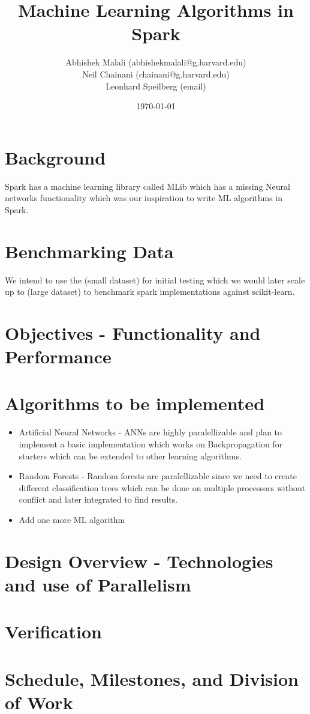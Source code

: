 \documentclass{article}
\begin{document}
	\title{Machine Learning Algorithms in Spark}
	\author{Abhishek Malali (abhishekmalali@g.harvard.edu)\\
			Neil Chainani (chainani@g.harvard.edu)\\
			Leonhard Speilberg (email)}
	\date{\today}
	\maketitle
	\section{Background}
	Spark has a machine learning library called MLib which has a missing Neural networks functionality which was our inspiration to write ML algorithms in Spark.

	\section{Benchmarking Data}
	We intend to use the (small dataset) for initial testing which we would later scale up to (large dataset) to benchmark spark implementations against scikit-learn. 


	\section{Objectives - Functionality and Performance}

	\section{Algorithms to be implemented}
		\begin{itemize}
			\item Artificial Neural Networks - ANNs are highly paralellizable and plan to implement a basic implementation which works on Backpropagation for starters which can be extended to other learning algorithms.
			\item Random Forests - Random forests are paralellizable since we need to create different classification trees which can be done on multiple processors without conflict and later integrated to find results.
			\item Add one more ML algorithm
		\end{itemize}

	\section{Design Overview - Technologies and use of Parallelism}

	\section{Verification}

	\section{Schedule, Milestones, and Division of Work}
\end{document}
